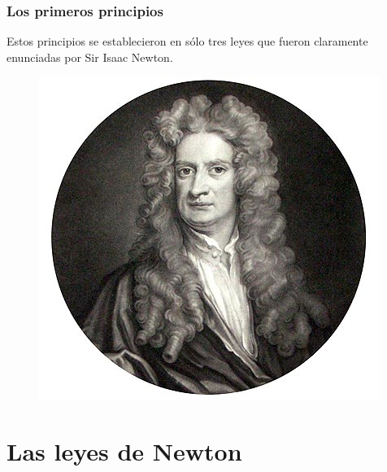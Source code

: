 \documentclass[14pt]{beamer}
\begin{document}
\begin{frame}
\frametitle{Los primeros principios}
\vspace*{-1cm}
Estos principios se establecieron en sólo tres leyes que fueron claramente enunciadas por Sir Isaac Newton.
\begin{figure}
    \centering
    \includegraphics[scale=0.35]{Imagenes/Newton.jpg}
\end{figure}
\end{frame}

\section{Las leyes de Newton}

\end{document}
